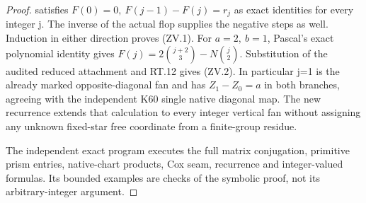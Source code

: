 \begin{proof}
satisfies \(F(0)=0,\ F(j-1)-F(j)=r_j\) as exact identities for every
integer j. The inverse of the actual flop supplies the negative steps
as well. Induction in either direction proves (ZV.1). For \(a=2,\ b=1\),
Pascal's exact polynomial identity gives \(F(j)=2\binom{j+2}{3}-N\binom j2\).
Substitution of the audited reduced attachment and RT.12 gives (ZV.2).
In particular j=1 is the already marked opposite-diagonal fan and
has \(Z_1-Z_0=a\) in both branches, agreeing with the independent K60
single native diagonal map. The new recurrence extends that
calculation to every integer vertical fan without assigning any
unknown fixed-star free coordinate from a finite-group residue.

The independent exact program
 executes the full
matrix conjugation, primitive prism entries, native-chart products,
Cox seam, recurrence and integer-valued formulas. Its bounded examples
are checks of the symbolic proof, not its arbitrary-integer argument.
\end{proof}
